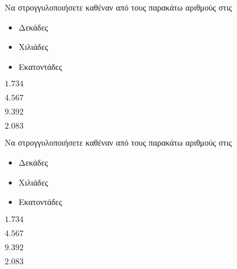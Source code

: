 Να στρογγυλοποιήσετε καθέναν από τους παρακάτω αριθμούς στις
\begin{multicols}{3}
\begin{itemize}[leftmargin=2mm]
\item Δεκάδες
\item Χιλιάδες
\item Εκατοντάδες
\end{itemize}
\end{multicols}
\begin{multicols}{2}
\begin{rlist}
\item $ 1.734 $
\item $ 4.567 $
\item $ 9.392 $
\item $ 2.083 $
\end{rlist}
\end{multicols}
Να στρογγυλοποιήσετε καθέναν από τους παρακάτω αριθμούς στις
\begin{multicols}{3}
\begin{itemize}[leftmargin=2mm]
\item Δεκάδες
\item Χιλιάδες
\item Εκατοντάδες
\end{itemize}
\end{multicols}
\begin{multicols}{2}
\begin{rlist}
\item $ 1.734 $
\item $ 4.567 $
\item $ 9.392 $
\item $ 2.083 $
\end{rlist}
\end{multicols}

